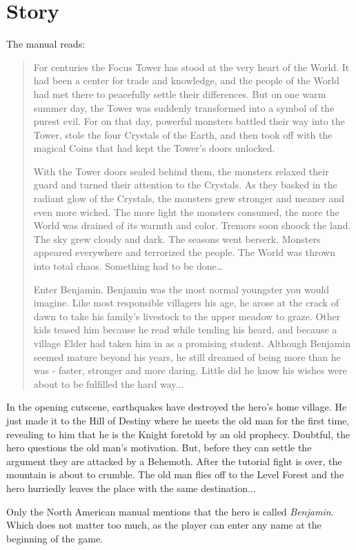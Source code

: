 \chapter{Story}

The manual reads:

\begin{quote}

For centuries the Focus Tower has stood at the very heart of the World. It had been a center for trade and knowledge, and the people of the World had met there to peacefully settle their differences. But on one warm summer day, the Tower was suddenly transformed into a symbol of the purest evil. For on that day, powerful monsters battled their way into the Tower, stole the four Crystals of the Earth, and then took off with the magical Coins that had kept the Tower’s doors unlocked.

With the Tower doors sealed behind them, the monsters relaxed their guard and turned their attention to the Crystals. As they basked in the radiant glow of the Crystals, the monsters grew stronger and meaner and even more wicked. The more light the monsters consumed, the more the World was drained of its warmth and color. Tremors soon shoock the land. The sky grew cloudy and dark. The seasons went berserk. Monsters appeared everywhere and terrorized the people. The World was thrown into total chaos. Something had to be done…
 
Enter Benjamin. Benjamin was the most normal youngster you would imagine. Like most responsible villagers his age, he arose at the crack of dawn to take his family’s livestock to the upper meadow to graze. Other kids teased him because he read while tending his heard, and because a village Elder had taken him in as a promising student. Although Benjamin seemed mature beyond his years, he still dreamed of being more than he was - faster, stronger and more daring. Little did he know his wishes were about to be fulfilled the hard way...

\end{quote}

In the opening cutscene, earthquakes have destroyed the hero’s home village. He just made it to the Hill of Destiny where he meets the old man for the first time, revealing to him that he is the Knight foretold by an old prophecy. Doubtful, the hero questions the old man’s motivation. But, before they can settle the argument they are attacked by a Behemoth. After the tutorial fight is over, the mountain is about to crumble. The old man flies off to the Level Forest and the hero hurriedly leaves the place with the same destination...

\bigskip

Only the North American manual mentions that the hero is called \textit{Benjamin}. Which does not matter too much, as the player can enter any name at the beginning of the game.
